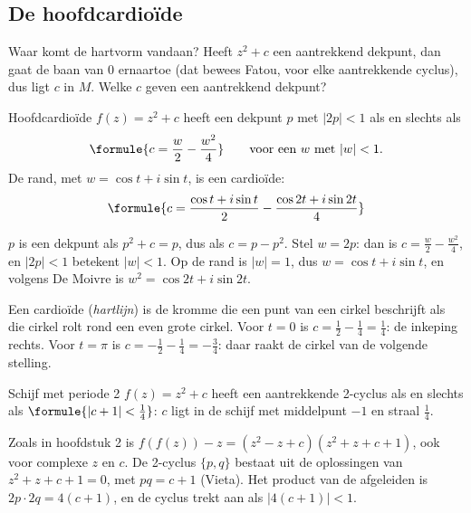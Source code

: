 \begin{oefeningen}
\end{oefeningen}

\subsection{De hoofdcardioïde}

Waar komt de hartvorm vandaan? Heeft $z^2 + c$ een aantrekkend dekpunt, dan gaat de baan van 0 ernaartoe (dat bewees Fatou, voor elke aantrekkende cyclus), dus ligt $c$ in $M$. Welke $c$ geven een aantrekkend dekpunt?

\begin{theorie}
\begin{stelling}{Hoofdcardioïde}
$f(z) = z^2 + c$ heeft een dekpunt $p$ met $|2p| < 1$ als en slechts als
\[
\formule{c = \frac{w}{2} - \frac{w^2}{4}} \qquad \text{voor een } w \text{ met } |w| < 1 .
\]
De rand, met $w = \cos t + i \sin t$, is een cardioïde:
\[
\formule{c = \frac{\cos t + i\sin t}{2} - \frac{\cos 2t + i\sin 2t}{4}}
\]
\end{stelling}

\begin{bewijs}
$p$ is een dekpunt als $p^2 + c = p$, dus als $c = p - p^2$. Stel $w = 2p$: dan is $c = \tfrac w2 - \tfrac{w^2}{4}$, en $|2p| < 1$ betekent $|w| < 1$. Op de rand is $|w| = 1$, dus $w = \cos t + i\sin t$, en volgens De Moivre is $w^2 = \cos 2t + i\sin 2t$.
\end{bewijs}
\end{theorie}

Een cardioïde (\textit{hartlijn}) is de kromme die een punt van een cirkel beschrijft als die cirkel rolt rond een even grote cirkel. Voor $t = 0$ is $c = \tfrac12 - \tfrac14 = \tfrac14$: de inkeping rechts. Voor $t = \pi$ is $c = -\tfrac12 - \tfrac14 = -\tfrac34$: daar raakt de cirkel van de volgende stelling.

\begin{theorie}
\begin{stelling}{Schijf met periode 2}
$f(z) = z^2 + c$ heeft een aantrekkende 2-cyclus als en slechts als $\formule{|c + 1| < \tfrac14}$: $c$ ligt in de schijf met middelpunt $-1$ en straal $\tfrac14$.
\end{stelling}

\begin{bewijs}
Zoals in hoofdstuk 2 is $f(f(z)) - z = (z^2 - z + c)(z^2 + z + c + 1)$, ook voor complexe $z$ en $c$. De 2-cyclus $\{p, q\}$ bestaat uit de oplossingen van $z^2 + z + c + 1 = 0$, met $pq = c + 1$ (Vieta). Het product van de afgeleiden is $2p \cdot 2q = 4(c + 1)$, en de cyclus trekt aan als $|4(c + 1)| < 1$.
\end{bewijs}
\end{theorie}

